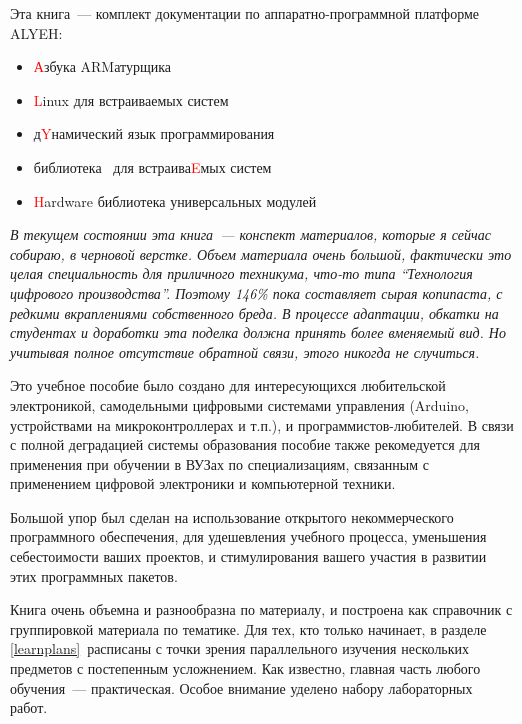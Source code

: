 \clearpage{}

Эта книга\ --- комплект документации по аппаратно-программной платформе
ALYEH:

\begin{itemize}[nosep]
  \item \textcolor{red}{А}збука ARMатурщика
  \item \textcolor{red}{L}inux для встраиваемых систем
  \item д\textcolor{red}{Y}намический язык программирования 
  \item библиотека \cpp\ для встраива\textcolor{red}{E}мых систем  
  \item \textcolor{red}{H}ardware библиотека универсальных модулей
\end{itemize}
\bigskip

\emph{В текущем состоянии эта книга\ --- конспект материалов, которые я сейчас
собираю, в черновой верстке. Объем материала очень большой, фактически это целая
специальность для приличного техникума, что-то типа ``Технология цифрового
производства''. Поэтому 146\% пока составляет сырая копипаста, с редкими
вкраплениями собственного бреда. В процессе адаптации, обкатки на студентах и
доработки эта поделка должна принять более вменяемый вид. Но учитывая полное
отсутствие обратной связи, этого никогда не случиться.}
\bigskip

Это учебное пособие было создано для интересующихся любительской электроникой,
самодельными цифровыми системами управления (Arduino, устройствами на
микроконтроллерах и т.п.), и программистов-лю\-би\-те\-лей. В связи с полной
деградацией системы образования пособие также рекомедуется для применения при
обучении в ВУЗах по специализациям, связанным с применением цифровой электроники
и компьютерной техники.

Большой упор был сделан на использование открытого некоммерческого программного
обеспечения, для удешевления учебного процесса, уменьшения себестоимости ваших
проектов, и
стимулирования вашего участия в развитии этих программных пакетов.

Книга очень объемна и разнообразна по материалу, и построена как справочник с
группировкой материала по тематике. Для тех, кто только начинает, в разделе
\ref{learnplans}\ расписаны  с
точки зрения параллельного изучения нескольких предметов с постепенным
усложнением. Как
известно, главная часть любого обучения\ --- практическая. Особое внимание
уделено набору лабораторных работ.

